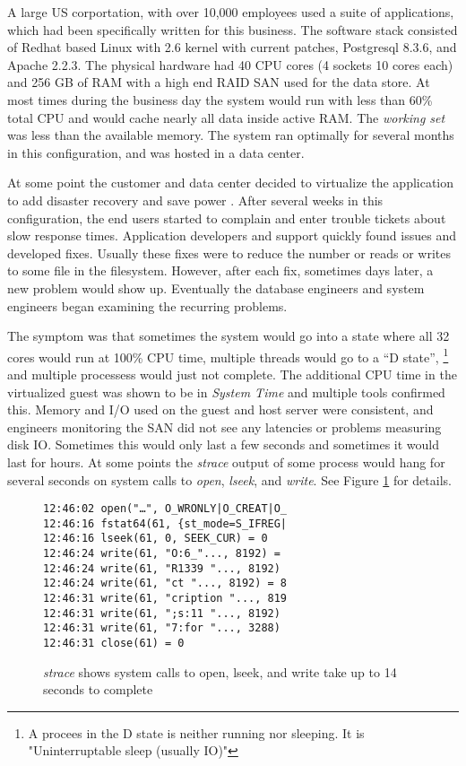 A large US corportation, with over 10,000 employees used a suite of applications, which had been specifically written for this business. The software stack consisted of Redhat based Linux with 2.6 kernel with current patches, Postgresql 8.3.6, and Apache 2.2.3.  The physical hardware had 40 CPU cores (4 sockets 10 cores each) and 256 GB of RAM with a high end RAID SAN used for the data store.  At most times during the business day the system would run with less than 60\% total CPU and would cache nearly all data inside active RAM.  The \emph{working set} was less than the available memory.  The system ran optimally for several months in this configuration, and was hosted in a data center.

\indent At some point the customer and data center decided to virtualize the application to add disaster recovery \cite{wood} and save power \cite{lim}.  After several weeks in this configuration, the end users started to complain and enter trouble tickets about slow response times.  Application developers and support quickly found issues and developed fixes.   Usually these fixes were to reduce the number or reads or writes to some file in the filesystem.  However, after each fix, sometimes days later, a new problem would show up.  Eventually the database engineers and system engineers began examining the recurring problems.

\indent The symptom was that sometimes the system would go into a state where all 32 cores would run at 100\% CPU time, multiple threads would go to a “D state”, \footnote{A procees in the D state is neither running nor sleeping.  It is "Uninterruptable sleep (usually IO)"} and multiple processess would just not complete.  The additional CPU time in the virtualized guest was shown to be in \emph{System Time} and multiple tools confirmed this.  Memory and I/O used on the guest and host server were consistent, and engineers monitoring the SAN did not see any latencies or problems measuring disk IO.  Sometimes this would only last a few seconds and sometimes it would last for hours. At some points the \emph{strace} output of some process would hang for several seconds on system calls to \emph{open}, \emph{lseek}, and \emph{write}.  See Figure \ref{fig:syscalls} for details.

\begin{figure}
\begin{Verbatim}
12:46:02 open("…", O_WRONLY|O_CREAT|O_
12:46:16 fstat64(61, {st_mode=S_IFREG| 
12:46:16 lseek(61, 0, SEEK_CUR) = 0 
12:46:24 write(61, "O:6_"..., 8192) =  
12:46:24 write(61, "R1339 "..., 8192)  
12:46:24 write(61, "ct "..., 8192) = 8 
12:46:31 write(61, "cription "..., 819  
12:46:31 write(61, ";s:11 "..., 8192)  
12:46:31 write(61, "7:for "..., 3288)  
12:46:31 close(61) = 0
\end{Verbatim}
\label{fig:syscalls}
\caption{\emph{strace} shows system calls to open, lseek, and write take up to 14 seconds to complete}
\end{figure}

